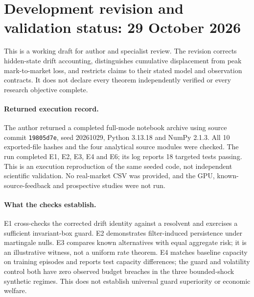 \documentclass[12pt]{article}
\theoremstyle{definition}
\theoremstyle{remark}
\begin{document}
\section*{Development revision and validation status: 29 October 2026}
This is a working draft for author and specialist review. The revision corrects
hidden-state drift accounting, distinguishes cumulative displacement from peak
mark-to-market loss, and restricts claims to their stated model and observation
contracts. It does not declare every theorem independently verified or every
research objective complete.

\paragraph{Returned execution record.} The author returned a completed full-mode
notebook archive using source commit \texttt{19805d7e}, seed 20261029,
Python 3.13.18 and NumPy 2.1.3. All 10 exported-file hashes and the four analytical
source modules were checked. The run completed E1, E2, E3, E4 and E6; its log
reports 18 targeted tests passing. This is an execution reproduction of the same
seeded code, not independent scientific validation. No real-market CSV was
provided, and the GPU, known-source-feedback and prospective studies were not run.

\paragraph{What the checks establish.} E1 cross-checks the corrected drift identity
against a resolvent and exercises a sufficient invariant-box guard. E2 demonstrates
filter-induced persistence under martingale nulls. E3 compares known alternatives
with equal aggregate risk; it is an illustrative witness, not a uniform rate
theorem. E4 matches baseline capacity on training episodes and reports test
capacity differences; the guard and volatility control both have zero observed
budget breaches in the three bounded-shock synthetic regimes. This does not
establish universal guard superiority or economic welfare.
\end{document}
